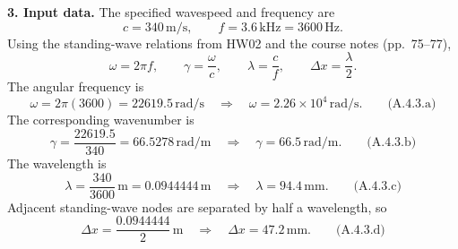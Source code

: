 \textbf{3. Input data.} The specified wavespeed and frequency are
\[
\boxed{c=340\,\mathrm{m/s},\qquad f=3.6\,\mathrm{kHz}=3600\,\mathrm{Hz}.}
\]
Using the standing-wave relations from HW02 and the course notes (pp.~75--77),
\[
\omega=2\pi f,\qquad \gamma=\frac{\omega}{c},\qquad
\lambda=\frac{c}{f},\qquad \Delta x=\frac{\lambda}{2}.
\]
The angular frequency is
\[
\omega=2\pi(3600)=22619.5\,\mathrm{rad/s}
\quad\Longrightarrow\quad
\boxed{\omega=2.26\times10^4\,\mathrm{rad/s}.}\qquad\text{(A.4.3.a)}
\]
The corresponding wavenumber is
\[
\gamma=\frac{22619.5}{340}=66.5278\,\mathrm{rad/m}
\quad\Longrightarrow\quad
\boxed{\gamma=66.5\,\mathrm{rad/m}.}\qquad\text{(A.4.3.b)}
\]
The wavelength is
\[
\lambda=\frac{340}{3600}\,\mathrm{m}=0.0944444\,\mathrm{m}
\quad\Longrightarrow\quad
\boxed{\lambda=94.4\,\mathrm{mm}.}\qquad\text{(A.4.3.c)}
\]
Adjacent standing-wave nodes are separated by half a wavelength, so
\[
\Delta x=\frac{0.0944444}{2}\,\mathrm{m}
\quad\Longrightarrow\quad
\boxed{\Delta x=47.2\,\mathrm{mm}.}\qquad\text{(A.4.3.d)}
\]

\clearpage
{}

